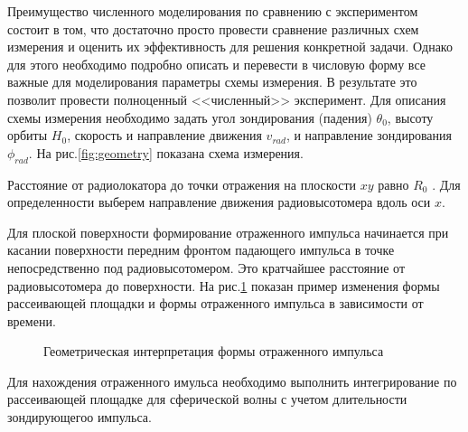 Преимущество численного моделирования по сравнению с экспериментом состоит в
том, что достаточно просто провести сравнение различных схем измерения и
оценить их эффективность для решения конкретной задачи. Однако для этого
необходимо подробно описать и перевести в числовую форму все важные для
моделирования параметры схемы измерения. В результате это позволит провести
полноценный <<численный>> эксперимент.  Для описания схемы измерения необходимо
задать угол зондирования (падения) $\theta_0$, высоту орбиты $H_0$, скорость и
направление движения $v_{rad}$, и направление зондирования $\phi_{rad}$. На рис.\ref{fig:geometry} показана схема измерения. 

Расстояние от радиолокатора до точки отражения на плоскости $xy$ равно $R_0$ .
Для определенности выберем направление движения радиовысотомера вдоль оси $x$.


Для плоской поверхности формирование отраженного импульса начинается при
касании поверхности передним фронтом падающего импульса в точке непосредственно
под радиовысотомером. Это кратчайшее расстояние от радиовысотомера до
поверхности. На рис.\ref{fig:wave_form} показан пример изменения формы
рассеивающей площадки и формы отраженного импульса в зависимости от времени.

\begin{figure}[h]
    \centering
    \hfill
    \begin{subfigure}{0.25\linewidth}
        \centering
        
    \end{subfigure}
    \hfill
    \begin{subfigure}{0.25\linewidth}
        \centering
        
    \end{subfigure}
    \hfill
    \begin{subfigure}{0.25\linewidth}
        \centering
        
    \end{subfigure}
    \label{fig:wave_form}
    \caption{Геометрическая интерпретация формы отраженного импульса}
\end{figure}

Для нахождения отраженного имульса необходимо выполнить интегрирование по
рассеивающей площадке для сферической волны с учетом длительности зондирующегоо
импульса.




